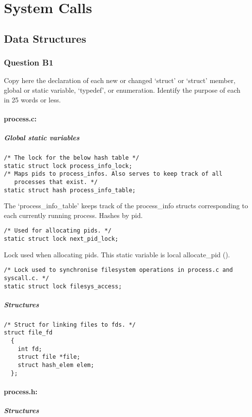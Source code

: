 \section{System Calls}
\subsection{Data Structures}
\subsubsection*{Question B1} %
Copy here the declaration of each new or changed `struct' or `struct' member, global or static variable, `typedef', or enumeration.  Identify the purpose of each in 25 words or less.

\paragraph{process.c:}
\subparagraph{Global static variables}

\begin{verbatim}
/* The lock for the below hash table */
static struct lock process_info_lock;
/* Maps pids to process_infos. Also serves to keep track of all
   processes that exist. */
static struct hash process_info_table;
\end{verbatim}
The `process\_info\_table' keeps track of the process\_info structs corresponding to each currently running process. Hashes by pid.

\begin{verbatim}
/* Used for allocating pids. */
static struct lock next_pid_lock;
\end{verbatim}
Lock used when allocating pids. This static variable is local allocate\_pid ().

\begin{verbatim}
/* Lock used to synchronise filesystem operations in process.c and syscall.c. */
static struct lock filesys_access;
\end{verbatim}

\subparagraph{Structures}

\begin{verbatim}
/* Struct for linking files to fds. */
struct file_fd
  {
    int fd;
    struct file *file;
    struct hash_elem elem;
  };
\end{verbatim}

\paragraph{process.h:}
\subparagraph{Structures}

